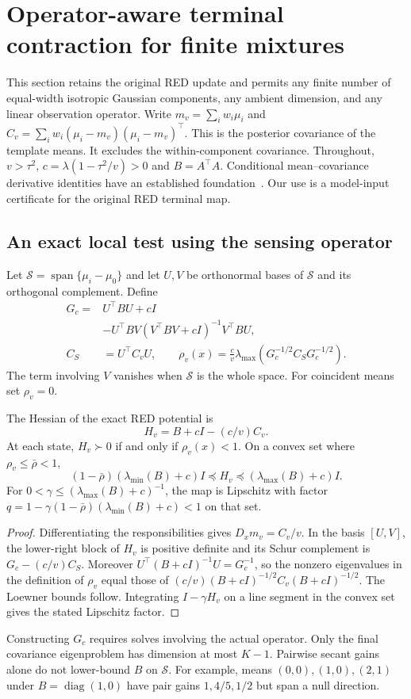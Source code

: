 \section{Operator-aware terminal contraction for finite mixtures}
\label{sec:terminal_history}
This section retains the original RED update and permits any finite
number of equal-width isotropic Gaussian components, any ambient
dimension, and any linear observation operator.
Write $m_v=\sum_iw_i\mu_i$ and
$C_v=\sum_iw_i(\mu_i-m_v)(\mu_i-m_v)^\top$.
This is the posterior covariance of the template means.
It excludes the within-component covariance.
Throughout, $v>\tau^2$, $c=\lambda(1-\tau^2/v)>0$ and $B=A^\top A$.
Conditional mean--covariance derivative identities have an established
foundation~\cite{dytso2023}. Our use is a model-input certificate for
the original RED terminal map.

\subsection{An exact local test using the sensing operator}
Let $\mathcal S=\operatorname{span}\{\mu_i-\mu_0\}$ and let
$U,V$ be orthonormal bases of $\mathcal S$ and its orthogonal
complement. Define
\begin{align}
 G_c={}&U^\top BU+cI \nonumber\\
 &-U^\top BV(V^\top BV+cI)^{-1}V^\top BU,\\
 C_S&=U^\top C_vU,\qquad
 \rho_v(x)=\frac cv\lambda_{\max}(G_c^{-1/2}C_SG_c^{-1/2}).
\end{align}
The term involving $V$ vanishes when $\mathcal S$ is the whole space.
For coincident means set $\rho_v=0$.
\begin{proposition}\label{prop:operator_posterior}
The Hessian of the exact RED potential is
\[
 H_v=B+cI-(c/v)C_v.
\]
At each state, $H_v\succ0$ if and only if $\rho_v(x)<1$.
On a convex set where $\rho_v\le\bar\rho<1$,
\[
 (1-\bar\rho)(\lambda_{\min}(B)+c)I
 \preceq H_v\preceq(\lambda_{\max}(B)+c)I.
\]
For $0<\gamma\le(\lambda_{\max}(B)+c)^{-1}$,
the map is Lipschitz with factor
$q=1-\gamma(1-\bar\rho)(\lambda_{\min}(B)+c)<1$ on that set.
\end{proposition}
\begin{proof}
Differentiating the responsibilities gives $D_xm_v=C_v/v$.
In the basis $[U,V]$, the lower-right block of $H_v$ is positive
definite and its Schur complement is $G_c-(c/v)C_S$.
Moreover $U^\top(B+cI)^{-1}U=G_c^{-1}$, so the nonzero eigenvalues
in the definition of $\rho_v$ equal those of
$(c/v)(B+cI)^{-1/2}C_v(B+cI)^{-1/2}$.
The Loewner bounds follow.
Integrating $I-\gamma H_v$ on a line segment in the convex set
gives the stated Lipschitz factor.
\end{proof}
Constructing $G_c$ requires solves involving the actual operator.
Only the final covariance eigenproblem has dimension at most $K-1$.
Pairwise secant gains alone do not lower-bound $B$ on $\mathcal S$.
For example, means $(0,0),(1,0),(2,1)$ under
$B=\operatorname{diag}(1,0)$ have pair gains $1,4/5,1/2$ but
span a null direction.

